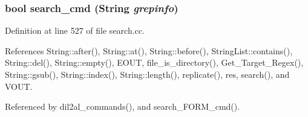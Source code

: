 \subsubsection{\setlength{\rightskip}{0pt plus 5cm}bool search\_\-cmd ({\bf String} {\em grepinfo})}\label{dil2al_8hh_a365}




Definition at line 527 of file search.cc.

References String::after(), String::at(), String::before(), String\-List::contains(), String::del(), String::empty(), EOUT, file\_\-is\_\-directory(), Get\_\-Target\_\-Regex(), String::gsub(), String::index(), String::length(), replicate(), res, search(), and VOUT.

Referenced by dil2al\_\-commands(), and search\_\-FORM\_\-cmd().



